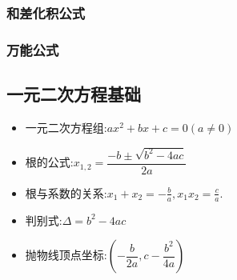 \documentclass[8pt a4paper, oneside, UTF8]{ctexbook}  %
\begin{document}
\begin{sloppypar}
    \subsubsection{和差化积公式}
    \begin{center}
    \end{center}
    \subsubsection{万能公式}
    \begin{center}
    \end{center}
    \subsection{一元二次方程基础}
    \begin{itemize}
        \item 一元二次方程组:$a x^2 +bx+c=0(a \neq 0)$
        \item 根的公式:$x_{1,2}=\dfrac{-b\pm\sqrt{b^2-4ac}}{2a}$
        \item 根与系数的关系:$x_{1}+x_{2}=-\frac{b}{a},x_{1}x_{2}=\frac{c}{a}.$
        \item 判别式:$\Delta=b^2-4ac$
        \item 抛物线顶点坐标:$(-\dfrac{b}{2a},c-\dfrac{b^2}{4a})$
    \end{itemize}

\end{sloppypar}
\end{document}
